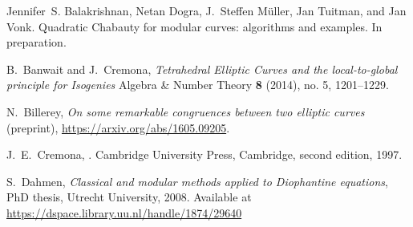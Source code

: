 \documentclass[12pt, reqno]{amsart}
\newcommand{\calL}{\mathcal{L}}
\newcommand{\calM}{\mathcal{M}}
\numberwithin{equation}{section}
\theoremstyle{definition}
\theoremstyle{remark}
\begin{document}



 
\begin{thebibliography}{999}


 Jennifer~S. Balakrishnan, Netan Dogra, J.~Steffen
  M\"uller, Jan Tuitman, and Jan Vonk.
\newblock Quadratic Chabauty for modular curves: algorithms and
examples.
\newblock
In preparation.

 B.\ Banwait and J.\ Cremona, 
{\em Tetrahedral Elliptic Curves and the local-to-global principle for Isogenies}
Algebra \& Number Theory {\bf 8} (2014), no. 5, 1201--1229.

 N.~Billerey,
  {\em On some remarkable congruences between two elliptic curves}
 (preprint),  \url{https://arxiv.org/abs/1605.09205}.


J.~E.~Cremona,
.
\newblock Cambridge University Press, Cambridge, second edition, 1997.

 S.\ Dahmen,
 {\em Classical and modular methods applied to Diophantine equations}, 
 PhD thesis, Utrecht University, 2008. Available at \\
 \url{https://dspace.library.uu.nl/handle/1874/29640}


\end{thebibliography}
\end{document}
